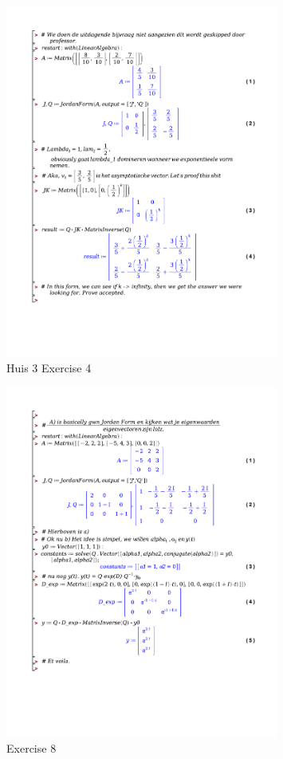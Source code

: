 \documentclass[a4paper]{report}
\begin{document}



\begin{figure}[H]
	\centering
	\includegraphics[width=0.8\textwidth]{exercises/huis_3_ex_4.pdf}
	\caption{Huis 3 Exercise 4}
	\label{fig:huis_3_ex_4_Maple}
\end{figure}



\begin{figure}[H]
	\centering
	\includegraphics[width=0.8\textwidth]{exercises/huis_3_ex_8.pdf}
	\caption{Exercise 8}
	\label{fig:huis_3_ex_8}
\end{figure}
\end{document}
